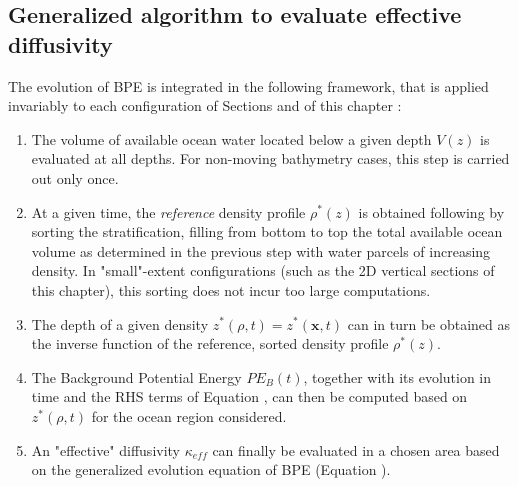 \subsection{Generalized algorithm to evaluate effective diffusivity}
\label{BPE_algo}
The evolution of BPE is integrated in the following framework, that is applied invariably to each configuration of Sections  and  of this chapter : 
\begin{enumerate}
\setlength\itemsep{0pt}
\item The volume of available ocean water located below a given depth $V(z)$ is evaluated at all depths. For non-moving bathymetry cases, this step is carried out only once. 
\item At a given time, the \textit{reference} density profile $\rho^*(z)$ is obtained following \citet{winters_available_1995} by sorting the stratification, filling from bottom to top the total available ocean volume as determined in the previous step with water parcels of increasing density. In "small"-extent configurations (such as the 2D vertical sections of this chapter), this sorting does not incur too large computations.
\item The depth of a given density $z^*(\rho,t)=z^*(\mathbf{x},t)$ can in turn be obtained as the inverse function of the reference, sorted density profile $\rho^*(z)$. 
\item The Background Potential Energy $PE_B(t)$, together with its evolution in time and the RHS terms of Equation , can then be computed based on $z^*(\rho,t)$ for the ocean region considered.
\item An "effective" diffusivity $\kappa_{eff}$ can finally be evaluated in a chosen area based on the generalized evolution equation of BPE (Equation ).
\end{enumerate}

